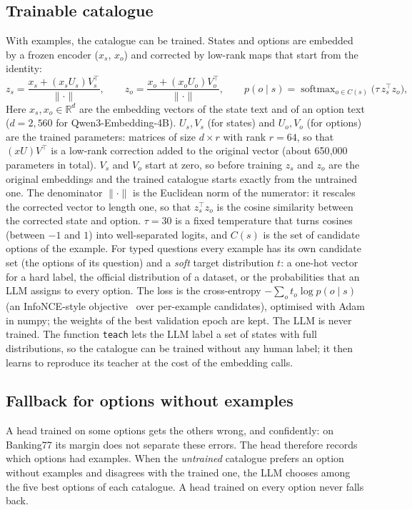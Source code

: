 \documentclass[11pt]{article}
\begin{document}
\subsection{Trainable catalogue}\label{sec:training}
With examples, the catalogue can be trained. States and options are embedded by a frozen encoder ($x_s$, $x_o$) and
corrected by low-rank maps that start from the identity:
\begin{equation}
z_s = \frac{x_s + (x_s U_s) V_s^\top}{\lVert \cdot \rVert},\qquad
z_o = \frac{x_o + (x_o U_o) V_o^\top}{\lVert \cdot \rVert},\qquad
p(o\mid s) = \operatorname{softmax}_{o\in C(s)}\!\big(\tau\, z_s^\top z_o\big),
\end{equation}
Here $x_s, x_o \in \mathbb{R}^{d}$ are the embedding vectors of the state text and of an option text ($d=2{,}560$ for
Qwen3-Embedding-4B). $U_s, V_s$ (for states) and $U_o, V_o$ (for options) are the trained parameters: matrices of
size $d \times r$ with rank $r=64$, so that $(x U)V^\top$ is a low-rank correction added to the original vector
(about 650{,}000 parameters in total). $V_s$ and $V_o$ start at zero, so before training $z_s$ and $z_o$ are the
original embeddings and the trained catalogue starts exactly from the untrained one. The denominator
$\lVert\cdot\rVert$ is the Euclidean norm of the numerator: it rescales the corrected vector to length one, so that
$z_s^\top z_o$ is the cosine similarity between the corrected state and option. $\tau=30$ is a fixed temperature
that turns cosines (between $-1$ and $1$) into well-separated logits, and $C(s)$ is the set of candidate options
of the example. For typed questions every example has its own candidate set (the options of its question) and a
\emph{soft} target distribution $t$: a one-hot vector for a hard label, the
official distribution of a dataset, or the probabilities that an LLM assigns to every option. The loss is the
cross-entropy $-\sum_o t_o \log p(o\mid s)$ (an InfoNCE-style objective~\citep{infonce,clip} over per-example
candidates), optimised with Adam in numpy; the weights of the best validation epoch are kept. The LLM is never
trained. The function \texttt{teach} lets the LLM label a set of states with full distributions, so the catalogue can
be trained without any human label; it then learns to reproduce its teacher at the cost of the embedding calls.

\subsection{Fallback for options without examples}\label{sec:fallback}
A head trained on some options gets the others wrong, and confidently: on Banking77 its margin does not separate
these errors. The head therefore records which options had examples. When the \emph{untrained} catalogue prefers an
option without examples and disagrees with the trained one, the LLM chooses among the five best options of each
catalogue. A head trained on every option never falls back.
\end{document}
